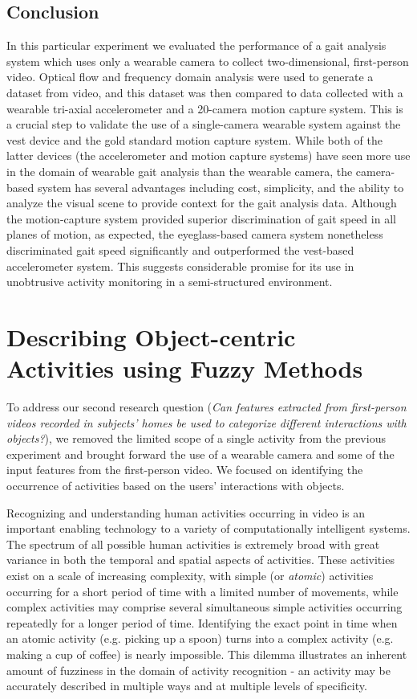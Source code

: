 \documentclass[12pt]{report}
\begin{document}
\subsection{Conclusion}
In this particular experiment we evaluated the performance of a gait analysis system which uses only a wearable camera to collect two-dimensional, first-person video. Optical flow and frequency domain analysis were used to generate a dataset from video, and this dataset was then compared to data collected with a wearable tri-axial accelerometer and a 20-camera motion capture system. This is a crucial step to validate the use of a single-camera wearable system against the vest device and the gold standard motion capture system. While both of the latter devices (the accelerometer and motion capture systems) have seen more use in the domain of wearable gait analysis than the wearable camera, the camera-based system has several advantages including cost, simplicity, and the ability to analyze the visual scene to provide context for the gait analysis data. Although the motion-capture system provided superior discrimination of gait speed in all planes of motion, as expected, the eyeglass-based camera system nonetheless discriminated gait speed significantly and outperformed the vest-based accelerometer system. This suggests considerable promise for its use in unobtrusive activity monitoring in a semi-structured environment.

\section{Describing Object-centric Activities using Fuzzy Methods}
To address our second research question (\emph{Can features extracted from first-person videos recorded in subjects’ homes be used to categorize different interactions with objects?}), we removed the limited scope of a single activity from the previous experiment and brought forward the use of a wearable camera and some of the input features from the first-person video. We focused on identifying the occurrence of activities based on the users' interactions with objects.

Recognizing and understanding human activities occurring in video is an important enabling technology to a variety of computationally intelligent systems. The spectrum of all possible human activities is extremely broad with great variance in both the temporal and spatial aspects of activities. These activities exist on a scale of increasing complexity, with simple (or \textit{atomic}) activities occurring for a short period of time with a limited number of movements, while complex activities may comprise several simultaneous simple activities occurring repeatedly for a longer period of time. Identifying the exact point in time when an atomic activity (e.g. picking up a spoon) turns into a complex activity (e.g. making a cup of coffee) is nearly impossible. This dilemma illustrates an inherent amount of fuzziness in the domain of activity recognition - an activity may be accurately described in multiple ways and at multiple levels of specificity.
\end{document}
